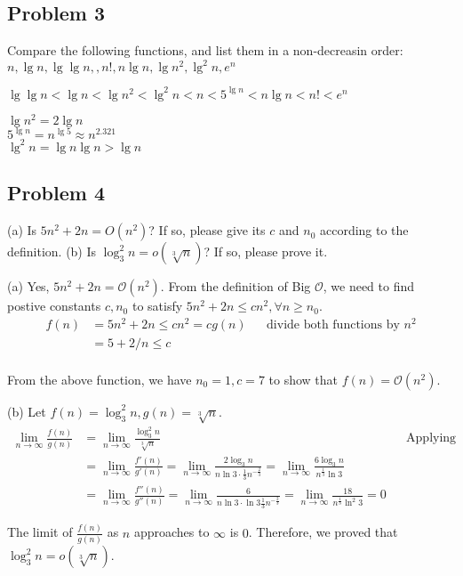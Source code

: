 \documentclass[a4paper]{article}
\makeatletter
\newenvironment{solution}
  {\begin{proof}[Solution]}
  {\end{proof}}
\renewenvironment{proof}[1][\proofname]{%
  \par\pushQED{\qed}\normalfont%
  \topsep6\p@\@plus6\p@\relax
  \trivlist\item[\hskip\labelsep\bfseries#1\@addpunct{.}]%
  \ignorespaces
}{%
  \popQED\endtrivlist\@endpefalse
}
\makeatother
\begin{document}
\subsection*{Problem 3}
Compare the following functions, and list them in a non-decreasin order: $n, \lg n, \lg \lg n,, n!, n \lg n, \lg n^2, \lg^2 n, e^n$
\begin{solution}
  $\lg\lg n < \lg n < \lg n^2 < \lg^2 n< n < 5^{\lg n} < n \lg n < n! < e^n$

 $\lg n^2 = 2\lg n$ \\
 $5^{\lg n} = n^{\lg 5} \approx n^{2.321}$ \\
 $\lg^2 n = \lg n \lg n > \lg n$
\end{solution}

\subsection*{Problem 4}
(a) Is $5n^2+2n =O(n^2)$? If so, please give its $c$ and $n_0$ according to the definition.
(b) Is $\log_3^2 n =o(\sqrt[3]n)$? If so, please prove it.
\begin{solution}
  (a) Yes, $5n^2 + 2n = \mathcal{O}(n^2)$. From the definition of Big $\mathcal{O}$, we need to find postive constants $c, n_0$ to satisfy $5n^2 + 2n \le cn^2, \forall n \ge n_0$.
  \begin{align*}
    f(n) &= 5n^2 + 2n \le cn^ 2 = cg(n) && \text{divide both functions by $n^2$}\\
        &= 5 + 2/n \le c \\
  \end{align*}

  From the above function, we have $n_0 = 1, c = 7$ to show that $f(n) = \mathcal{O}(n^2)$.
\end{solution}

\begin{solution}
  (b) Let $f(n) = \log_3^2 n, g(n) = \sqrt[3]{n}$.
  \begin{align*}
    \lim\limits_{n \to \infty}\frac{f(n)}{g(n)} &= \lim\limits_{n \to \infty}\frac{\log_3^2 n}{\sqrt[3]n} && \text{Applying L'Hospital's Rule} \\
                                                &= \lim\limits_{n \to \infty}\frac{f'(n)}{g'(n)} =  \lim\limits_{n \to \infty}\frac{2\log_3 n}{n \ln 3 \cdot \frac{1}{3} n^{-\frac{2}{3}}} = \lim\limits_{n \to \infty}\frac{6 \log_3 n}{n^{\frac{1}{3}} \ln 3}\\
                                                &= \lim\limits_{n \to \infty}\frac{f''(n)}{g''(n)} =\lim\limits_{n \to \infty}\frac{6}{n \ln 3 \cdot \ln 3 \frac{1}{3} n^{-\frac{2}{3}}} = \lim\limits_{n \to \infty}\frac{18}{n^{\frac{1}{3}} \ln^2 3} = 0
  \end{align*}

  The limit of $\frac{f(n)}{g(n)}$ as $n$ approaches to $\infty$ is $0$. Therefore, we proved that $\log_3^2 n = o(\sqrt[3]{n})$.
\end{solution}
\end{document}
